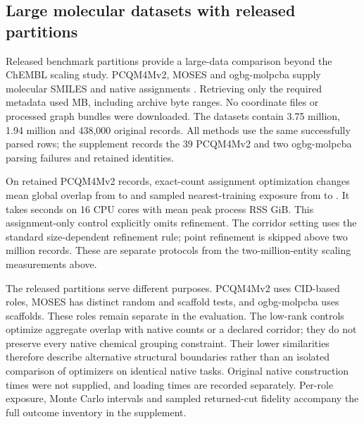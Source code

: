 \subsection{Large molecular datasets with released partitions}
\label{sec:native-molecular}

Released benchmark partitions provide a large-data comparison beyond the
ChEMBL scaling study. PCQM4Mv2, MOSES and ogbg-molpcba supply molecular SMILES
and native assignments \citep{hu2021ogblsc,polykovskiy2020moses,hu2020ogb}.
Retrieving only the required metadata used \NativeMetadataMB{} MB, including
archive byte ranges. No coordinate files or processed graph bundles were downloaded.
The datasets contain 3.75 million, 1.94 million and 438,000 original records.
All methods use the same successfully parsed rows; the supplement records
the 39 PCQM4Mv2 and two ogbg-molpcba parsing failures and retained identities.



On \NativeLargestRecords{} retained PCQM4Mv2 records, exact-count assignment
optimization changes mean global overlap from \NativePcqmNativeGlobal{} to
\NativePcqmExactGlobal{} and sampled nearest-training exposure from
\NativePcqmNativeNearest{} to \NativePcqmExactNearest{}. It takes
\NativePcqmExactSeconds{} seconds on 16 CPU cores with mean peak process RSS
\NativePcqmExactMemory{} GiB. This assignment-only control explicitly omits
refinement. The corridor setting uses the standard size-dependent refinement
rule; point refinement is skipped above two million records. These are
separate protocols from the two-million-entity scaling measurements above.

The released partitions serve different purposes. PCQM4Mv2 uses CID-based
roles, MOSES has distinct random and scaffold tests, and ogbg-molpcba
uses scaffolds. These roles remain separate in the evaluation. The low-rank
controls optimize aggregate overlap with native counts or a declared corridor;
they do not preserve every native chemical grouping constraint. Their lower
similarities therefore describe alternative structural boundaries rather than
an isolated comparison of optimizers on identical native tasks. Original
native construction times were not supplied, and loading times are recorded
separately. Per-role exposure, Monte Carlo intervals and sampled returned-cut
fidelity accompany the full outcome inventory in the supplement.
